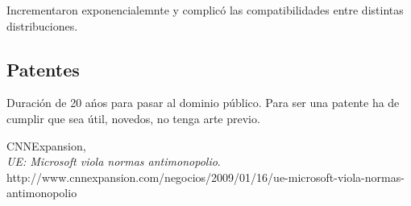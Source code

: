 \documentclass[11pt]{scrartcl}
\begin{document}
Incrementaron exponencialemnte y complic\'o las compatibilidades entre distintas distribuciones.

\subsection{Patentes}

Duraci\'on de 20 a\'nos para pasar al dominio p\'ublico. Para ser una patente ha de cumplir que sea \'util, novedos, no tenga arte previo.
\begin{thebibliography}{9}

		CNNExpansion,\\
		\emph{UE: Microsoft viola normas antimonopolio}.\\
		http://www.cnnexpansion.com/negocios/2009/01/16/ue-microsoft-viola-normas-antimonopolio
\end{thebibliography}
\end{document}
